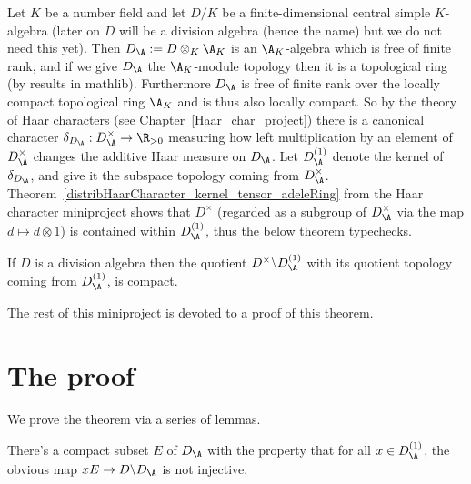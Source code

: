Let $K$ be a number field and let $D/K$ be a finite-dimensional central simple $K$-algebra
(later on $D$ will be a division algebra (hence the name) but we do not need this yet).
Then $D_{\A}:=D\otimes_K\A_K$ is an $\A_K$-algebra which
is free of finite rank, and if we give $D_{\A}$ the $\A_K$-module topology then it is
a topological ring (by results in mathlib). Furthermore $D_{\A}$ is free of finite
rank over the locally compact topological ring $\A_K$ and is thus also
locally compact. So by the theory of Haar characters (see Chapter~\ref{Haar_char_project})
there is a canonical character $\delta_{D_{\A}}:D_{\A}^\times\to\R_{>0}$ measuring
how left multiplication by an element of $D_{\A}^\times$ changes the additive Haar
measure on $D_{\A}$. Let $D_{\A}^{(1)}$ denote the kernel of $\delta_{D_{\A}}$,
and give it the subspace topology coming from $D_{\A}^\times$.
Theorem~\ref{distribHaarCharacter_kernel_tensor_adeleRing} from the
Haar character miniproject shows that $D^\times$ (regarded as a subgroup of $D_{\A}^\times$
via the map $d\mapsto d\otimes 1$) is contained within $D_{\A}^{(1)}$,
thus the below theorem typechecks.

\begin{theorem}
  \label{NumberField.AdeleRing.DivisionAlgebra.compact_quotient}
  \leanok
  If $D$ is a division algebra then
  the quotient $D^\times\backslash D_{\A}^{(1)}$
  with its quotient topology coming from $D_{\A}^{(1)}$, is compact.
\end{theorem}

The rest of this miniproject is devoted to a proof of this theorem.

\section{The proof}

We prove the theorem via a series of lemmas.

\begin{lemma}
  \label{NumberField.AdeleRing.DivisionAlgebra.Aux.existsE}
  \leanok
  There's a compact subset $E$ of $D_{\A}$
  with the property that for all $x\in D_{\A}^{(1)}$,
  the obvious map $xE\to D\backslash D_{\A}$ is not injective.
\end{lemma}

